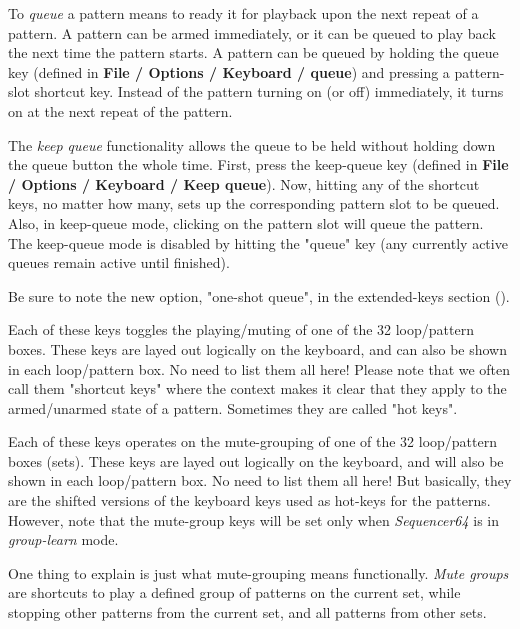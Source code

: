    To \textsl{queue}
   a pattern means to ready it for playback upon the next repeat
   of a pattern.  A pattern can be armed immediately, or it can be queued to
   play back the next time the pattern starts.
   A pattern can be queued by holding the queue key (defined in
   \textbf{File / Options / Keyboard / queue}) and pressing a pattern-slot
   shortcut key.  Instead of the pattern turning on (or off)
   immediately, it turns on at the next repeat of the pattern.

   The \textsl{keep queue}
   functionality allows the queue to be held without holding
   down the queue button the whole time.  First, press the keep-queue key
   (defined in \textbf{File / Options / Keyboard / Keep queue}).  Now, hitting
   any of the shortcut keys, no matter how many, sets up the corresponding
   pattern slot to be queued.  Also, in keep-queue mode, clicking on the
   pattern slot will queue the pattern.  The keep-queue mode is disabled by
   hitting the "queue" key (any currently active queues remain active until
   finished).

   Be sure to note the new option, "one-shot queue", in the extended-keys
   section ().

   Each of these keys toggles the playing/muting of one of the 32
   loop/pattern boxes.  These keys are layed out logically on the keyboard,
   and can also be shown in each loop/pattern box.  No need to list them all
   here!  Please note that we often call them "shortcut keys" where the context
   makes it clear that they apply to the armed/unarmed state of a pattern.
   Sometimes they are called "hot keys".

   Each of these keys operates on the mute-grouping of one of the 32
   loop/pattern boxes (sets).  These keys are layed out logically on the
   keyboard, and will also be shown in each loop/pattern box.  No need to list
   them all here!  But basically, they are the shifted versions of the
   keyboard keys used as hot-keys for the patterns.
   However, note that the mute-group keys will be set only when
   \textsl{Sequencer64} is in
    \textsl{group-learn} mode.

   One thing to explain is just what mute-grouping means functionally.
   \textsl{Mute groups} are shortcuts to play a defined group of patterns
   on the current set, while stopping other patterns from the current set, and
   all patterns from other sets.

